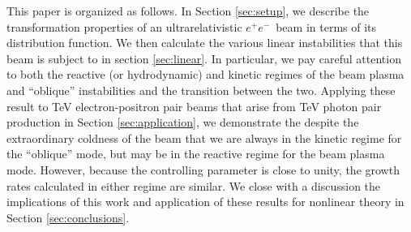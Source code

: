 \documentclass[usenatbib,iop,apj,numberedappendix]{aeb_emulateapj_2010}
\newcommand\ac[1]{{\color{green} \bf #1}} %
\newcommand\bmath[1] {\mbox{\boldmath$\rm #1$}}
\newcommand{\epm}{\ensuremath{e^+e^-}}
\begin{document}
This paper is organized as follows.  In Section \ref{sec:setup}, we describe the transformation properties of an ultrarelativistic \epm\ beam in terms of its distribution function.  We then calculate the various linear instabilities that this beam is subject to in section \ref{sec:linear}.  In particular, we pay careful attention to both the reactive (or hydrodynamic) and kinetic regimes of the beam plasma and ``oblique'' instabilities and the transition between the two.  Applying these result to TeV electron-positron pair beams that arise from TeV photon pair production in Section \ref{sec:application},
we demonstrate the despite the extraordinary coldness of the beam that we are always in the kinetic regime for the ``oblique'' mode, but may be in the reactive regime for the beam plasma mode.  However, because the controlling parameter is close to unity, the growth rates calculated in either regime are similar.  We close with a discussion the implications of this work and application of these results for nonlinear theory in Section \ref{sec:conclusions}.

\end{document}
